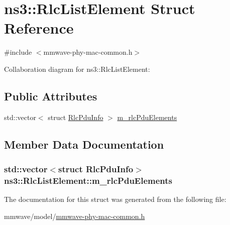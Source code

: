 \hypertarget{structns3_1_1RlcListElement}{}\section{ns3\+:\+:Rlc\+List\+Element Struct Reference}
\label{structns3_1_1RlcListElement}


{\ttfamily \#include $<$mmwave-\/phy-\/mac-\/common.\+h$>$}



Collaboration diagram for ns3\+:\+:Rlc\+List\+Element\+:
\subsection*{Public Attributes}
\begin{DoxyCompactItemize}
\item 
std\+::vector$<$ struct \hyperlink{structns3_1_1RlcPduInfo}{Rlc\+Pdu\+Info} $>$ \hyperlink{structns3_1_1RlcListElement_a060d32fca5869a89d93e1cb97cf2c7b7}{m\+\_\+rlc\+Pdu\+Elements}
\end{DoxyCompactItemize}


\subsection{Member Data Documentation}
\subsubsection[{\texorpdfstring{m\+\_\+rlc\+Pdu\+Elements}{m_rlcPduElements}}]{\setlength{\rightskip}{0pt plus 5cm}std\+::vector$<$struct {\bf Rlc\+Pdu\+Info}$>$ ns3\+::\+Rlc\+List\+Element\+::m\+\_\+rlc\+Pdu\+Elements}\hypertarget{structns3_1_1RlcListElement_a060d32fca5869a89d93e1cb97cf2c7b7}{}\label{structns3_1_1RlcListElement_a060d32fca5869a89d93e1cb97cf2c7b7}


The documentation for this struct was generated from the following file\+:\begin{DoxyCompactItemize}
\item 
mmwave/model/\hyperlink{mmwave-phy-mac-common_8h}{mmwave-\/phy-\/mac-\/common.\+h}\end{DoxyCompactItemize}

